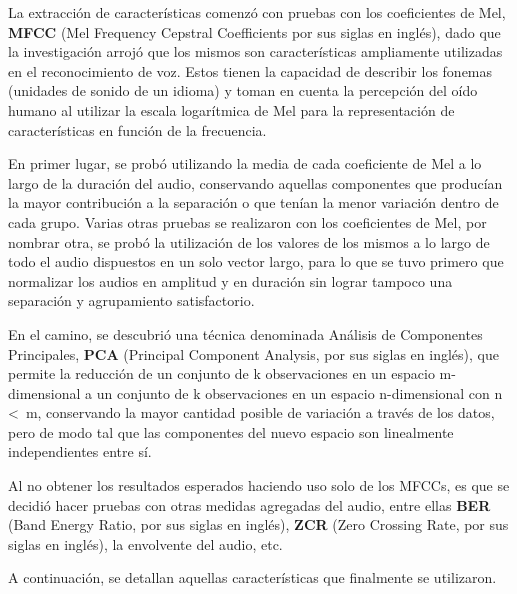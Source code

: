 \documentclass[a4paper, 12pt]{article}
\begin{document}
La extracción de características comenzó con pruebas con los coeficientes de Mel, \textbf{MFCC} (Mel Frequency Cepstral Coefficients por sus siglas en inglés), dado que la investigación arrojó que los mismos son características ampliamente utilizadas en el reconocimiento de voz. Estos tienen la capacidad de describir los fonemas (unidades de sonido de un idioma) y toman en cuenta la percepción del oído humano al utilizar la escala logarítmica de Mel para la representación de características en función de la frecuencia.

En primer lugar, se probó utilizando la media de cada coeficiente de Mel a lo largo de la duración del audio, conservando aquellas componentes que producían la mayor contribución a la separación o que tenían la menor variación dentro de cada grupo. Varias otras pruebas se realizaron con los coeficientes de Mel, por nombrar otra, se probó la utilización de los valores de los mismos a lo largo de todo el audio dispuestos en un solo vector largo, para lo que se tuvo primero que normalizar los audios en amplitud y en duración sin lograr tampoco una separación y agrupamiento satisfactorio.

En el camino, se descubrió una técnica denominada Análisis de Componentes Principales, \textbf{PCA} (Principal Component Analysis, por sus siglas en inglés), que permite la reducción de un conjunto de k observaciones en un espacio m-dimensional a un conjunto de k observaciones en un espacio n-dimensional con n \textless\ m, conservando la mayor cantidad posible de variación a través de los datos, pero de modo tal que las componentes del nuevo espacio son linealmente independientes entre sí.

Al no obtener los resultados esperados haciendo uso solo de los MFCCs, es que se decidió hacer pruebas con otras medidas agregadas del audio, entre ellas \textbf{BER} (Band Energy Ratio, por sus siglas en inglés), \textbf{ZCR} (Zero Crossing Rate, por sus siglas en inglés), la envolvente del audio, etc.

A continuación, se detallan aquellas características que finalmente se utilizaron.
\end{document}
